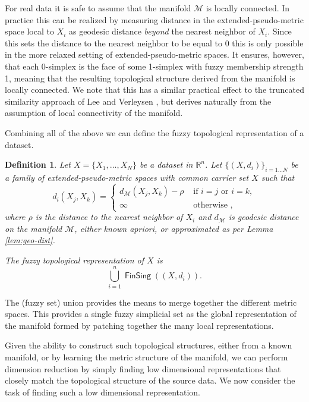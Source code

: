 \documentclass[12pt]{article}
\newtheorem{defn}{Definition}
\DeclareMathOperator{\FinSing}{\mathsf{FinSing}}
\begin{document}
For real data it is safe to assume that the manifold $\mathcal{M}$ is locally connected. In practice this can be realized by measuring distance in the extended-pseudo-metric space local to $X_i$ as geodesic distance \emph{beyond} the nearest neighbor of $X_i$. Since this sets the distance to the nearest neighbor to be equal to 0 this is only possible in the more relaxed setting of extended-pseudo-metric spaces. It ensures, however, that each 0-simplex is the face of some 1-simplex with fuzzy membership strength 1, meaning that the resulting topological structure derived from the manifold is locally connected. We note that this has a similar practical effect to the truncated similarity approach of Lee and Verleysen \cite{lee2011shift}, but derives naturally from the assumption of local connectivity of the manifold.

Combining all of the above we can define the fuzzy topological representation of a dataset.

\begin{defn}\label{defn:fuzz-topo-repr}
Let $X = \{X_1, \ldots, X_N\}$ be a dataset in $\mathbb{R}^n$. Let $\{(X, d_i)\}_{i=1\ldots N}$ be a family of extended-pseudo-metric spaces with common carrier set $X$ such that
\[
d_i(X_j, X_k) = \begin{cases}
       d_{\mathcal{M}}(X_j, X_k)  - \rho &  \text{ if $i = j$ or $i = k$},\\[8pt]
        \infty & \text{ otherwise },
    \end{cases}
\]
where $\rho$ is the distance to the nearest neighbor of $X_i$ and $d_{\mathcal{M}}$ is geodesic distance on the manifold $\mathcal{M}$, either known apriori, or approximated as per Lemma \ref{lem:geo-dist}.

The fuzzy topological representation of $X$ is
\[
\bigcup_{i=1}^n \FinSing((X, d_i)).
\]
\end{defn}

The (fuzzy set) union provides the means to merge together the different metric spaces. This provides a single fuzzy simplicial set as the global representation of the manifold formed by patching together the many local representations.

Given the ability to construct such topological structures, either from a known manifold, or by learning the metric structure of the manifold, we can perform dimension reduction by simply finding low dimensional representations that closely match the topological structure of the source data. We now consider the task of finding such a low dimensional representation.
\end{document}
